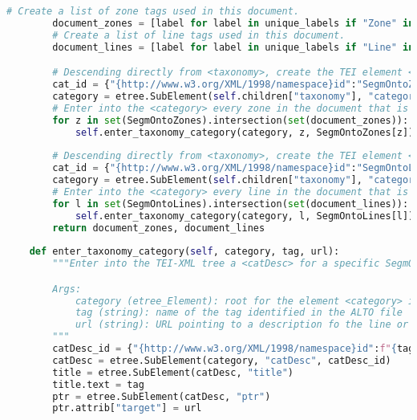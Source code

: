 \documentclass[class=article, crop=false]{standalone}
\begin{document}
\begin{lstlisting}[language=python, style=python]
        # Create a list of zone tags used in this document.
        document_zones = [label for label in unique_labels if "Zone" in label]
        # Create a list of line tags used in this document.
        document_lines = [label for label in unique_labels if "Line" in label]

        # Descending directly from <taxonomy>, create the TEI element <category> for SegmOnto zones.
        cat_id = {"{http://www.w3.org/XML/1998/namespace}id":"SegmOntoZones"}
        category = etree.SubElement(self.children["taxonomy"], "category", cat_id)
        # Enter into the <category> every zone in the document that is also named in the SemOnto guidelines.
        for z in set(SegmOntoZones).intersection(set(document_zones)):
            self.enter_taxonomy_category(category, z, SegmOntoZones[z])
        
        # Descending directly from <taxonomy>, create the TEI element <category> for SegmOnto lines.
        cat_id = {"{http://www.w3.org/XML/1998/namespace}id":"SegmOntoLines"}
        category = etree.SubElement(self.children["taxonomy"], "category", cat_id)
        # Enter into the <category> every line in the document that is also named in the SemOnto guidelines.
        for l in set(SegmOntoLines).intersection(set(document_lines)):
            self.enter_taxonomy_category(category, l, SegmOntoLines[l])
        return document_zones, document_lines
            
    def enter_taxonomy_category(self, category, tag, url):
        """Enter into the TEI-XML tree a <catDesc> for a specific SegmOnto line or zone.

        Args:
            category (etree_Element): root for the element <category> in the TEI-XML document
            tag (string): name of the tag identified in the ALTO file
            url (string): URL pointing to a description fo the line or zone in the SegmOnto guidelines
        """        
        catDesc_id = {"{http://www.w3.org/XML/1998/namespace}id":f"{tag}"}
        catDesc = etree.SubElement(category, "catDesc", catDesc_id)
        title = etree.SubElement(catDesc, "title")
        title.text = tag
        ptr = etree.SubElement(catDesc, "ptr")
        ptr.attrib["target"] = url

\end{lstlisting}
\end{document}
